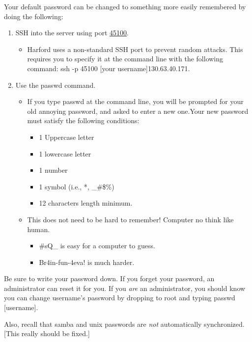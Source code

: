 \documentclass[final,titlepage,letterpaper,oneside,12pt]{article}
\renewcommand{\texttt}[2][BrickRed]{\textcolor{#1}{\ttfamily #2}}%
\begin{document}
Your default password can be changed to something more easily remembered by doing the following:
\begin{enumerate} \itemsep-2pt
    \item{SSH into the server using port \href{http://en.wikipedia.org/wiki/Looking_Glass_Studios}{45100}.}
    \begin{itemize} \itemsep-2pt
        \item{Harford uses a non-standard SSH port to prevent random attacks. This requires you to specify it at the command line with the following command: \texttt{ssh -p 45100 [your username]\@130.63.40.171}.}
    \end{itemize}
    \item{Use the \texttt{passwd} command.}
    \begin{itemize} \itemsep-2pt
        \item{If you type passwd at the command line, you will be prompted for your old annoying password, and asked to enter a new one.Your new password must satisfy the following conditions:}
        \begin{itemize} \itemsep-2pt
            \item{1 Uppercase letter}
            \item{1 lowercase letter}
            \item{1 number}
            \item{1 symbol (i.e., *, \_\#\$\%)}
            \item{12 characters length minimum.}
        \end{itemize}
        \item{This does not need to be hard to remember! Computer no think like human.}
        \begin{itemize} \itemsep-2pt
            \item{\texttt{\#sQ\_} is easy for a computer to guess.}
            \item{\texttt{Br4in-fun-4eva!} is much harder.}
        \end{itemize}
    \end{itemize}
\end{enumerate}

Be sure to write your password down. If you forget your password, an administrator can reset it for you. If you \textit{are} an administrator, you should know you can change \texttt{username}'s password by dropping to \texttt{root} and typing \texttt{passwd [username]}.

Also, recall that samba and unix passwords are \textit{not} automatically synchronized. [This really should be fixed.]
\end{document}
